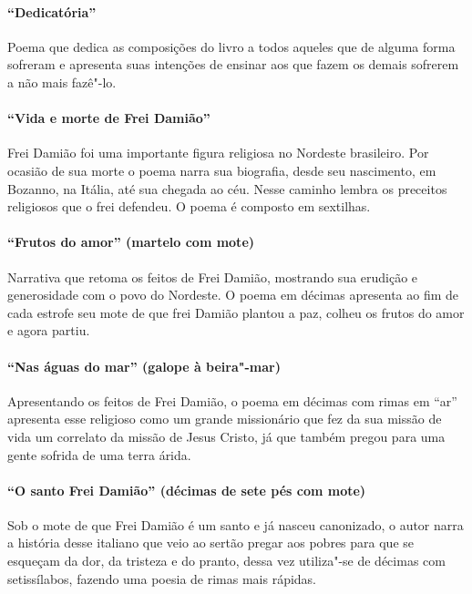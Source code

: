 \paragraph{``Dedicatória''}

Poema que dedica as composições do livro a todos aqueles que de alguma
forma sofreram e apresenta suas intenções de ensinar aos que fazem os
demais sofrerem a não mais fazê"-lo.

\paragraph{``Vida e morte de Frei Damião''}

Frei Damião foi uma importante figura religiosa no Nordeste brasileiro.
Por ocasião de sua morte o poema narra sua biografia, desde seu nascimento,
em Bozanno, na Itália, até sua chegada ao céu. Nesse caminho lembra os
preceitos religiosos que o frei defendeu. O poema é composto em
sextilhas.

\paragraph{``Frutos do amor'' (martelo com mote)}

Narrativa que retoma os feitos de Frei Damião, mostrando sua erudição e
generosidade com o povo do Nordeste. O poema em décimas apresenta ao
fim de cada estrofe seu mote de que frei Damião plantou a paz, colheu
os frutos do amor e agora partiu.

\paragraph{``Nas águas do mar'' (galope à beira"-mar)}

Apresentando os feitos de Frei Damião, o poema em décimas com rimas em
``ar'' apresenta esse religioso como
um grande missionário que fez da sua missão de vida um correlato da missão de
Jesus Cristo, já que também pregou para uma gente sofrida de uma terra
árida.

\paragraph{``O santo Frei Damião'' (décimas de sete pés com mote)}

Sob o mote de que Frei Damião é um santo e já nasceu canonizado, o autor
narra a história desse italiano que veio ao sertão pregar aos pobres
para que se esqueçam da dor, da tristeza e do pranto, dessa vez
utiliza"-se de décimas com setissílabos, fazendo uma poesia de rimas
mais rápidas.

